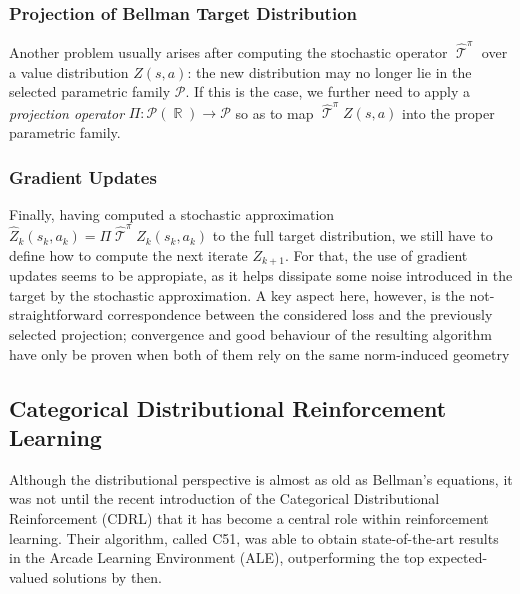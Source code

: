 \documentclass[12pt,a4paper,openright,twoside]{article}
\DeclareMathOperator*{\R}{\mathbb{R}}
\DeclareMathOperator*{\T}{\mathcal{T}}
\numberwithin{equation}{section}
\theoremstyle{definition}
\theoremstyle{remark}
\theoremstyle{plain}
\begin{document}
\subsubsection{Projection of Bellman Target Distribution}
Another problem usually arises after computing the stochastic operator $\widehat{\T}^\pi$ over a value distribution $Z(s,a)$: the new distribution may no longer lie in the selected parametric family $\mathcal{P}$. If this is the case, we further need to apply a \textit{projection operator} $\Pi : \mathscr{P}(\R) \rightarrow \mathcal{P}$ so as to map $\widehat{\T}^\pi Z(s,a)$ into the proper parametric family.

\subsubsection{Gradient Updates}
 Finally, having computed a stochastic approximation $\widehat{Z}_k (s_k,a_k) = \Pi \widehat{\T}^\pi Z_k(s_k,a_k)$ to the full target distribution, we still have to define how to compute the next iterate $Z_{k+1}$. For that, the use of gradient updates seems to be appropiate\cite{rlformulation}, as it helps dissipate some noise introduced in the target by the stochastic approximation. A key aspect here, however, is the not-straightforward correspondence between the considered loss and the previously selected projection; convergence and good behaviour of the resulting algorithm have only be proven when both of them rely on the same norm-induced geometry\cite{analysisC51,rlformulation}

\subsection{Categorical Distributional Reinforcement Learning}

Although the distributional perspective is almost as old as Bellman's equations\cite{firstDistributional}, it was not until the recent introduction of the Categorical Distributional Reinforcement\cite{DRL} (CDRL) that it has become a central role within reinforcement learning. Their algorithm, called C51, was able to obtain state-of-the-art results in the Arcade Learning Environment\cite{ALE} (ALE), outperforming the top expected-valued solutions by then.
\end{document}
